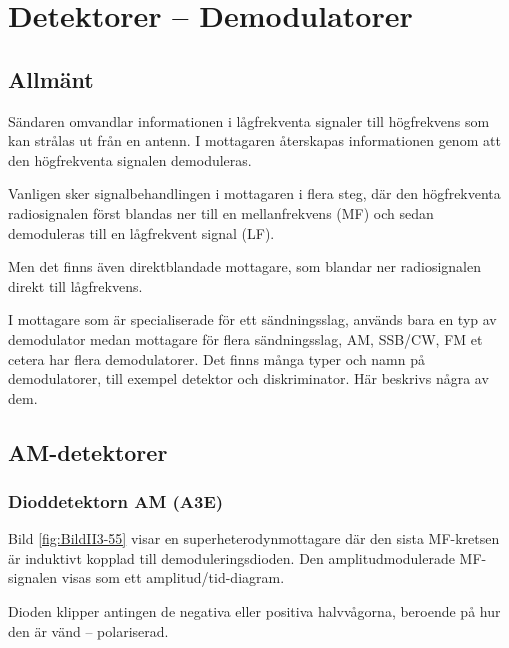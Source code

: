 \section{Detektorer -- Demodulatorer}
\label{detektorer}

\subsection{Allmänt}

Sändaren omvandlar informationen i lågfrekventa signaler till högfrekvens som
kan strålas ut från en antenn.
I mottagaren återskapas informationen genom att den högfrekventa signalen demoduleras.

Vanligen sker signalbehandlingen i mottagaren i flera steg, där den högfrekventa radiosignalen 
först blandas ner till en mellanfrekvens (MF) och sedan demoduleras till en lågfrekvent signal (LF).

Men det finns även direktblandade mottagare, som blandar ner radiosignalen direkt till lågfrekvens.

I mottagare som är specialiserade för ett sändningsslag, används bara en typ av
demodulator medan mottagare för flera sändningsslag, AM, SSB/CW, FM et cetera har
flera demodulatorer.
Det finns många typer och namn på demodulatorer, till exempel detektor och diskriminator.
Här beskrivs några av dem.

\subsection{AM-detektorer}

\subsubsection{Dioddetektorn AM (A3E)}


Bild \ref{fig:BildII3-55} visar en superheterodynmottagare där den sista
MF-kretsen är induktivt kopplad till demoduleringsdioden.
Den amplitudmodulerade MF-signalen visas som ett amplitud/tid-diagram.

Dioden klipper antingen de negativa eller positiva halvvågorna,
beroende på hur den är vänd -- polariserad.

